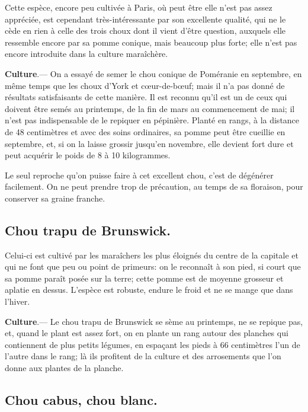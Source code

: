 \documentclass[10pt,a4paper]{book}
\begin{document}
Cette espèce, encore peu cultivée à Paris, où peut être elle n'est pas assez appréciée, est cependant très-intéressante par son excellente qualité, qui ne le cède en rien à celle des trois choux dont il vient d'être question, auxquels elle ressemble encore par sa pomme conique, mais beaucoup plus forte; elle n'est pas encore introduite dans la culture maraîchère.

\textbf{Culture}.--- On a essayé de semer le chou conique de Poméranie en septembre, en même temps que les choux d'York et cœur-de-bœuf; mais il n'a pas donné de résultats satisfaisants de cette manière. Il est reconnu qu'il est un de ceux qui doivent être semés au printemps, de la fin de mars au commencement de mai; il n'est pas indispensable de le repiquer en pépinière. Planté en rangs, à la distance de 48 centimètres et avec des soins ordinaires, sa pomme peut être cueillie en septembre, et, si on la laisse grossir jusqu'en novembre, elle devient fort dure et peut acquérir le poids de 8 à 10 kilogrammes.

Le seul reproche qu'on puisse faire à cet excellent chou, c'est de dégénérer facilement. On ne peut prendre trop de précaution, au temps de sa floraison, pour conserver sa graine franche.

\subsection{Chou trapu de Brunswick.}

Celui-ci est cultivé par les maraîchers les plus éloignés du centre de la capitale et qui ne font que peu ou point de primeurs: on le reconnaît à son pied, si court que sa pomme paraît posée sur la terre; cette pomme est de moyenne grosseur et aplatie en dessus. L'espèce est robuste, endure le froid et ne se mange que dans l'hiver.

\textbf{Culture}.--- Le chou trapu de Brunswick se sème au printemps, ne se repique pas, et, quand le plant est assez fort, on en plante un rang autour des planches qui contiennent de plus petits légumes, en espaçant les pieds à 66 centimètres l'un de l'autre dans le rang; là ils profitent de la culture et des arrosements que l'on donne aux plantes de la planche.

\subsection{Chou cabus, chou blanc.}
\end{document}
